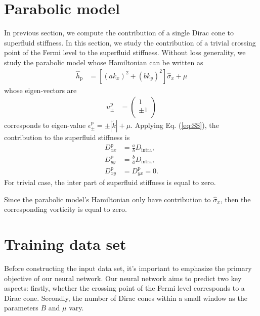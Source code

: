 \documentclass{article}
\begin{document}
\section{Parabolic model}
In previous section, we compute the contribution of a single Dirac cone to superfluid stiffness. In this section, we study the contribution of a trivial crossing point of the Fermi level to the superfluid stiffness. Without loss generality, we study the parabolic model whose Hamiltonian can be written as 
\begin{align}
    \hat{h}_{\textrm{p}} &= \left[(a k_x)^2 + (b k_y)^2\right] \hat{\sigma}_x + \mu 
\end{align}
whose eigen-vectors are 
\begin{align}
    u^{\textrm{p}} _\pm &= \left(\begin{array}{c}
         1 \\
         \pm 1 \\
    \end{array}\right)
\end{align}
corresponds to eigen-value $\epsilon^{\textrm{p}}_\pm =  \pm \left\vert \widetilde{k}  \right\vert + \mu  $. Applying Eq. (\ref{eq:SS}), the contribution to the superfluid stiffness is 
\begin{align}
    D^{\textrm{p}} _{xx} &= \frac{a}{b}D_{\textrm{intra}}, \\   
    D^{\textrm{p}} _{yy} &= \frac{b}{a}D_{\textrm{intra}}, \\   
    D^{\textrm{p}} _{xy} &= D^{\textrm{p}}_{yx} =0. 
\end{align}
For trivial case, the inter part of superfluid stiffness is equal to zero. 

Since the parabolic model's Hamiltonian only have contribution to $ \hat{\sigma}_x $, then the corresponding vorticity is equal to zero. 

\section{Training data set}
Before constructing the input data set, it's important to emphasize the primary objective of our neural network. Our neural network aims to predict two key aspects: firstly, whether the crossing point of the Fermi level corresponds to a Dirac cone. Secondly, the number of Dirac cones within a small window as the parameters $ B $ and $ \mu $ vary.
\end{document}
